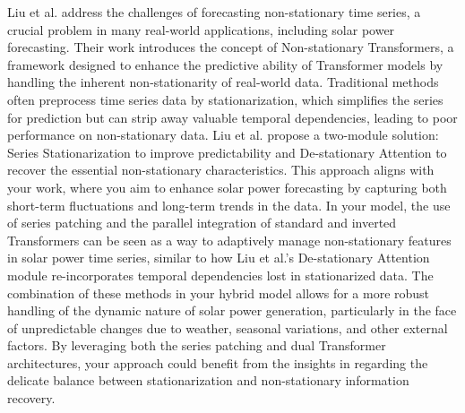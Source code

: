 \documentclass[12pt]{uomthesis}
\begin{document}
Liu et al. \cite{liu2022non} address the challenges of forecasting non-stationary time series, a crucial problem in many real-world applications, including solar power forecasting. Their work introduces the concept of Non-stationary Transformers, a framework designed to enhance the predictive ability of Transformer models by handling the inherent non-stationarity of real-world data. Traditional methods often preprocess time series data by stationarization, which simplifies the series for prediction but can strip away valuable temporal dependencies, leading to poor performance on non-stationary data. Liu et al. propose a two-module solution: Series Stationarization to improve predictability and De-stationary Attention to recover the essential non-stationary characteristics. This approach aligns with your work, where you aim to enhance solar power forecasting by capturing both short-term fluctuations and long-term trends in the data. In your model, the use of series patching and the parallel integration of standard and inverted Transformers can be seen as a way to adaptively manage non-stationary features in solar power time series, similar to how Liu et al.'s De-stationary Attention module re-incorporates temporal dependencies lost in stationarized data. The combination of these methods in your hybrid model allows for a more robust handling of the dynamic nature of solar power generation, particularly in the face of unpredictable changes due to weather, seasonal variations, and other external factors. By leveraging both the series patching and dual Transformer architectures, your approach could benefit from the insights in \cite{liu2022non} regarding the delicate balance between stationarization and non-stationary information recovery.
\end{document}
